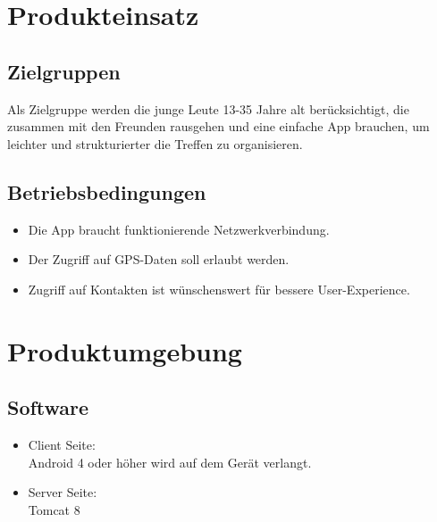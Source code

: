 \documentclass[parskip=full]{scrartcl}
\begin{document}
\newpage
\section{Produkteinsatz}
\subsection{Zielgruppen}
Als Zielgruppe werden die junge Leute 13-35 Jahre alt berücksichtigt, die zusammen mit den Freunden rausgehen und eine einfache App brauchen, um leichter und strukturierter die Treffen zu organisieren.

\subsection{Betriebsbedingungen}
\begin{itemize}
\item Die App braucht funktionierende Netzwerkverbindung.\\
\item Der Zugriff auf GPS-Daten soll erlaubt werden.\\
\item Zugriff auf Kontakten ist wünschenswert für bessere User-Experience.
\end{itemize}

\newpage
\section{Produktumgebung}

\subsection{Software}
\begin{itemize}
	\item Client Seite:\\
	Android 4 oder höher wird auf dem Gerät verlangt.
	\item Server Seite:\\
	Tomcat 8 
\end{itemize}
\end{document}
